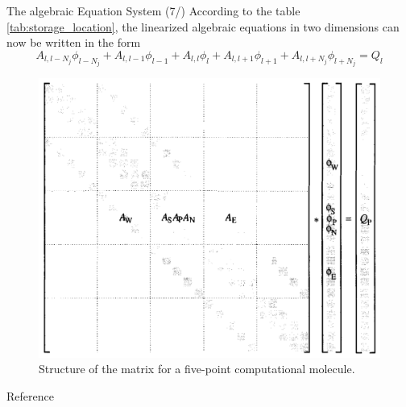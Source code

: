 \documentclass[10pt]{beamer}
\begin{document}
\begin{frame}{The algebraic Equation System (7/)}\small
According to the table \autoref{tab:storage_location}, the linearized algebraic equations in two dimensions can now be written in the form
    \[
    A_{l, l-N_{j}}\phi_{l-N_{j}} + A_{l, l-1}\phi_{l-1} + A_{l,l}\phi_{l} + A_{l, l+1}\phi_{l+1} +A_{l,l+N_{j}}\phi_{l+N_{j}} = Q_{l}
    \]
\begin{figure}[H]
    \centering
    \includegraphics[width=.6\textwidth]{imgs/five-point-matrix.png}
    \caption{Structure of the matrix for a five-point computational molecule.}
    \label{fig:my_label}
\end{figure}
\end{frame}
\appendix
\begin{frame}{Reference}
 
 
\end{frame}
\end{document}
